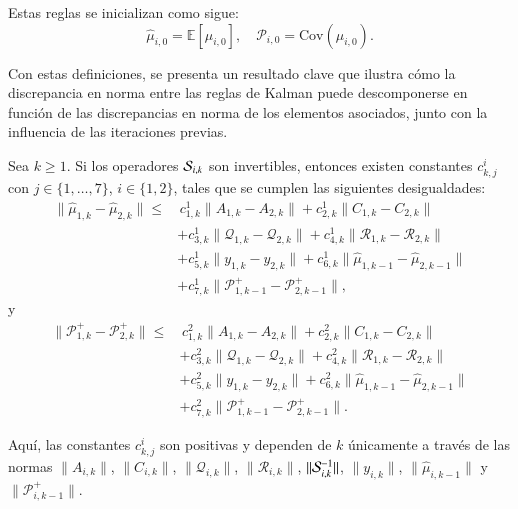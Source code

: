 Estas reglas se inicializan como sigue:
\begin{equation*}
	\hat{\mu}_{i,0} = \mathbb{E}[\mu_{i,0}], \quad \mathcal{P}_{i,0} = \text{Cov}(\mu_{i,0}).
\end{equation*}

Con estas definiciones, se presenta un resultado clave que ilustra cómo la discrepancia en norma entre las reglas de Kalman puede descomponerse en función de las discrepancias en norma de los elementos asociados, junto con la influencia de las iteraciones previas.


\begin{teo}
	Sea $k \geq 1$. Si los operadores $\S_{i,k}$ son invertibles, entonces existen constantes $c_{k,j}^i$ con $j \in \{1, \dots, 7\}$, $i \in \{1, 2\}$, tales que se cumplen las siguientes desigualdades:
	\begin{equation*}
		\begin{aligned}
			\| \hat{\mu}_{1,k} - \hat{\mu}_{2,k} \| \leq & \, c_{1,k}^1 \| A_{1,k} - A_{2,k} \| + c_{2,k}^1 \| C_{1,k} - C_{2,k} \| \\ 
			&+ c_{3,k}^1 \| \mathcal{Q}_{1,k} - \mathcal{Q}_{2,k} \| + c_{4,k}^1 \| \mathcal{R}_{1,k} - \mathcal{R}_{2,k} \| \\
			&+ c_{5,k}^1 \| y_{1,k} - y_{2,k} \| + c_{6,k}^1 \| \hat{\mu}_{1,k-1} - \hat{\mu}_{2,k-1} \| \\
			&+ c_{7,k}^1 \| \mathcal{P}_{1,k-1}^+ - \mathcal{P}_{2,k-1}^+ \|,
		\end{aligned}
	\end{equation*}
	y
	\begin{equation*}
		\begin{aligned}
			\| \mathcal{P}_{1,k}^+ - \mathcal{P}_{2,k}^+ \| \leq & \, c_{1,k}^2 \| A_{1,k} - A_{2,k} \| + c_{2,k}^2 \| C_{1,k} - C_{2,k} \| \\ 
			&+ c_{3,k}^2 \| \mathcal{Q}_{1,k} - \mathcal{Q}_{2,k} \| + c_{4,k}^2 \| \mathcal{R}_{1,k} - \mathcal{R}_{2,k} \| \\
			&+ c_{5,k}^2 \| y_{1,k} - y_{2,k} \| + c_{6,k}^2 \| \hat{\mu}_{1,k-1} - \hat{\mu}_{2,k-1} \| \\
			&+ c_{7,k}^2 \| \mathcal{P}_{1,k-1}^+ - \mathcal{P}_{2,k-1}^+ \|.
		\end{aligned}
	\end{equation*}

	Aquí, las constantes $c_{k,j}^i$ son positivas y dependen de $k$ únicamente a través de las normas $\| A_{i,k} \|$, $\| C_{i,k} \|$, $\| \mathcal{Q}_{i,k} \|$, $\| \mathcal{R}_{i,k} \|$, $\| \S_{i,k}^{-1} \|$, $\| y_{i,k} \|$, $\| \hat{\mu}_{i,k-1} \|$ y $\| \mathcal{P}_{i,k-1}^+ \|$.
	\label{teo:error_kalman}
\end{teo}

